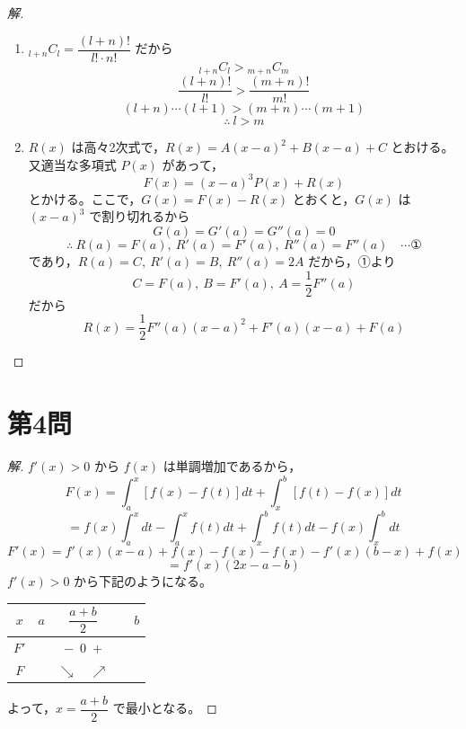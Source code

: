 \documentclass[../main.tex]{subfiles}
\begin{document}
\begin{proof}[解]
  \begin{enumerate}
    \item[(1)] $_{l+n}C_l = \dfrac{(l+n)!}{l!\cdot n!}$ だから
      \[
        {}_{l+n}C_l > {}_{m+n}C_m
      \]
      \[
        \frac{(l+n)!}{l!} > \frac{(m+n)!}{m!}
      \]
      \[
        (l+n)\cdots(l+1) > (m+n)\cdots(m+1)
      \]
      \[
        \therefore\ l>m
      \]

    \item[(2)] $R(x)$ は高々2次式で，$R(x)=A(x-a)^2+B(x-a)+C$ とおける。又適当な多項式 $P(x)$ があって，
      \[
        F(x)=(x-a)^3P(x)+R(x)
      \]
      とかける。ここで，$G(x)=F(x)-R(x)$ とおくと，$G(x)$ は $(x-a)^3$ で割り切れるから
      \[
        G(a)=G'(a)=G''(a)=0
      \]
      \[
        \therefore\ R(a)=F(a),\ R'(a)=F'(a),\ R''(a)=F''(a) \quad \cdots \text{①}
      \]
      であり，$R(a)=C,\ R'(a)=B,\ R''(a)=2A$ だから，①より
      \[
        C=F(a),\ B=F'(a),\ A=\frac{1}{2}F''(a)
      \]
      だから
      \[
        R(x)=\frac{1}{2}F''(a)(x-a)^2+F'(a)(x-a)+F(a)
      \]
  \end{enumerate}
\end{proof}

\newpage

\section*{第4問}

\begin{proof}[解]
  $f'(x)>0$ から $f(x)$ は単調増加であるから，
  \[
    F(x) = \int_a^x [f(x)-f(t)]dt + \int_x^b[f(t)-f(x)]dt
  \]
  \[
    = f(x)\int_a^x dt - \int_a^x f(t)dt + \int_x^b f(t)dt - f(x)\int_x^b dt
  \]
  \[
    F'(x) = f'(x)(x-a) + f(x) - f(x) - f(x) - f'(x)(b-x) + f(x)
  \]
  \[
    = f'(x)(2x-a-b)
  \]
  $f'(x)>0$ から下記のようになる。

  \begin{center}
    \begin{tabular}{c|c|c|c|c}
      $x$ & $a$ & $\dfrac{a+b}{2}$ & & $b$ \\
      \hline
      $F'$ & & $-$\ $0$\ $+$ & & \\
      \hline
      $F$ & & $\searrow$\ \ $\nearrow$ & &
    \end{tabular}
  \end{center}

  よって，$x=\dfrac{a+b}{2}$ で最小となる。
\end{proof}
\end{document}
